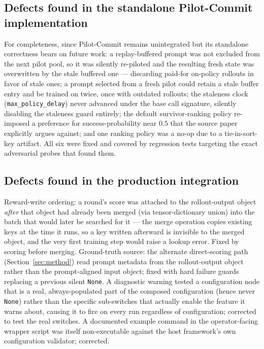 \documentclass[11pt]{article}
\begin{document}
\subsection{Defects found in the standalone Pilot-Commit implementation}
\label{sec:pc-bugs}

For completeness, since Pilot-Commit remains unintegrated but its standalone
correctness bears on future work: a replay-buffered prompt was not excluded from
the next pilot pool, so it was silently re-piloted and the resulting fresh state
was overwritten by the stale buffered one — discarding paid-for on-policy rollouts
in favor of stale ones; a prompt selected from a fresh pilot could retain a stale
buffer entry and be trained on twice, once with outdated rollouts; the staleness
clock (\texttt{max\_policy\_delay}) never advanced under the base call signature,
silently disabling the staleness guard entirely; the default survivor-ranking policy
re-imposed a preference for success-probability near $0.5$ that the source paper
explicitly argues against; and one ranking policy was a no-op due to a
tie-in-sort-key artifact. All six were fixed and covered by regression tests
targeting the exact adversarial probes that found them.

\subsection{Defects found in the production integration}
\label{sec:bugs}

Reward-write ordering: a round's score was attached to the rollout-output object
\emph{after} that object had already been merged (via tensor-dictionary union) into
the batch that would later be searched for it — the merge operation copies existing
keys at the time it runs, so a key written afterward is invisible to the merged
object, and the very first training step would raise a lookup error. Fixed by
scoring before merging. Ground-truth source: the alternate direct-scoring path
(Section~\ref{sec:method}) read prompt metadata from the rollout-output object
rather than the prompt-aligned input object; fixed with hard failure guards
replacing a previous silent \texttt{None}. A diagnostic warning tested a
configuration node that is a real, always-populated part of the composed
configuration (hence never \texttt{None}) rather than the specific sub-switches
that actually enable the feature it warns about, causing it to fire on every run
regardless of configuration; corrected to test the real switches. A documented
example command in the operator-facing wrapper script was itself non-executable
against the host framework's own configuration validator; corrected.
\end{document}
